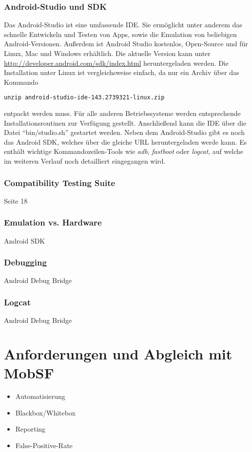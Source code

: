 			\subsubsection{Android-Studio und SDK}
			Das Android-Studio ist eine umfassende IDE. Sie ermöglicht unter anderem das schnelle Entwickeln und Testen von Apps, sowie die Emulation von beliebigen Android-Versionen. Außerdem ist Android Studio kostenlos, Open-Source und für Linux, Mac und Windows erhältlich. Die aktuelle Version kann unter \url{http://developer.android.com/sdk/index.html} heruntergeladen werden. Die Installation unter Linux ist vergleichsweise einfach, da nur ein Archiv über das Kommando 
\begin{lstlisting}
unzip android-studio-ide-143.2739321-linux.zip
\end{lstlisting}
entpackt werden muss. Für alle anderen Betriebssysteme werden entsprechende Installationsroutinen zur Verfügung gestellt. Anschließend kann die IDE über die Datei "`bin/studio.sh"' gestartet werden. Neben dem Android-Studio gibt es noch das Android SDK, welches über die gleiche URL heruntergeladen werde kann. Es enthält wichtige Kommandozeilen-Tools wie \textit{adb}, \textit{fastboot} oder \textit{logcat}, auf welche im weiteren Verlauf noch detailliert eingegangen wird.
			\subsubsection{Compatibility Testing Suite}
			\cite{Drake2014} Seite 18
			\subsubsection{Emulation vs. Hardware}
			Android SDK
			\subsubsection{Debugging}	
			Android Debug Bridge\cite{androidDebugBridge}
			\subsubsection{Logcat}	
			Android Debug Bridge\cite{androidDebugBridge}
	\section{Anforderungen und Abgleich mit MobSF}
	\begin{itemize}
		\item Automatisierung
		\item Blackbox/Whitebox
		\item Reporting
		\item False-Positive-Rate
	\end{itemize}
